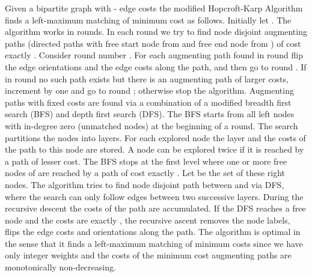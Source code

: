 \let\accentvec\vec \documentclass{llncs}
\begin{document}
Given a bipartite graph with - edge costs the modified Hopcroft-Karp Algorithm finds a left-maximum matching of minimum cost
as follows.
Initially let . The algorithm works in rounds. In each round we try to find node disjoint augmenting paths (directed paths with free start node from  and free end node from ) of cost exactly . Consider round number .
For each augmenting path found in round  flip the edge orientations and the edge costs along the path, and then go to round . If in  round  no such path exists but there is an augmenting path of larger costs, increment  by one and go to round ; otherwise stop the algorithm. Augmenting paths with fixed costs  are found via a combination of a modified breadth first search (BFS) and depth first search (DFS). 
The BFS starts from all left nodes with in-degree zero  (unmatched nodes) at the beginning of a round.
The search partitions the nodes into layers. For each explored node the layer and the costs of the path to this node are stored.
A node can be explored twice if it is reached by a path of lesser cost. The BFS stops at the first level where one or more free nodes of  are reached by a path of cost exactly . Let  be the set of these right nodes. The algorithm tries to find node disjoint path between  and  via DFS, where the search can only follow edges between two successive layers.
During the recursive descent the costs of the path are accumulated. If the DFS reaches a free node and the costs are exactly ,
the recursive ascent removes the node labels, flips the edge costs and orientations along the path.
The algorithm is optimal in the sense that it finds a left-maximum matching of minimum costs since we have only integer weights and the costs of the minimum cost augmenting paths are monotonically non-decreasing.
\end{document}
